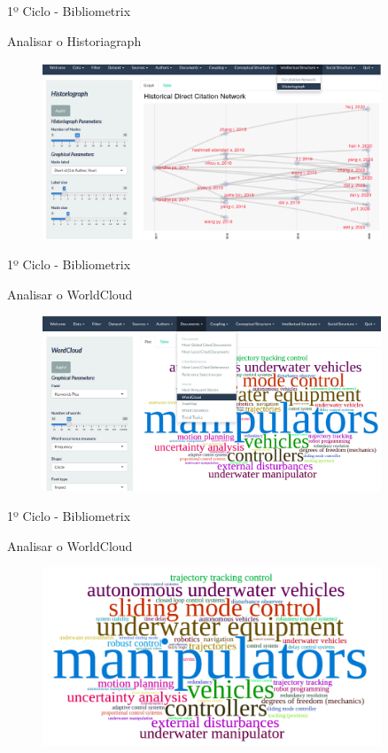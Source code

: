 \begin{frame}{1º Ciclo - Bibliometrix}

	Analisar o Historiagraph
	
	\begin{figure}[hb]
		\centering
		\includegraphics[width=0.9\textwidth]{figures/bibliometrix/b11.png}
	\end{figure}
	
\end{frame}

\begin{frame}{1º Ciclo - Bibliometrix}

	Analisar o WorldCloud
	
	\begin{figure}[hb]
		\centering
		\includegraphics[width=0.9\textwidth]{figures/bibliometrix/b12.png}
	\end{figure}
	
\end{frame}

\begin{frame}{1º Ciclo - Bibliometrix}

	Analisar o WorldCloud
	\begin{figure}[hb]
		\centering
		\includegraphics[width=0.9\textwidth]{figures/bibliometrix/b13.png}
	\end{figure}
	
\end{frame}

